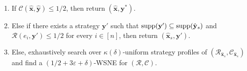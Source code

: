 \begin{algorithm}[H]
\begin{enumerate}[label=\arabic*.,leftmargin=1.8em,itemsep=0.18em,topsep=0.3em]
      \begin{enumerate}[label=(\alph*),leftmargin=2.2em,itemsep=0.1em,topsep=0.1em]
        \item If \(\mathcal{C}(\hat{\mathbf{x}},\hat{\mathbf{y}})\leq 1/2\), then return \((\hat{\mathbf{x}},\mathbf{y}^*)\).
        \item Else if there exists a strategy \(\mathbf{y}'\) such that
        \(\operatorname{supp}(\mathbf{y}')\subseteq\operatorname{supp}(\hat{\mathbf{y}}_s)\) and
        \(\mathcal{R}(e_i,\mathbf{y}')\leq 1/2\) for every \(i\in[n]\), then return \((\hat{\mathbf{x}}_s,\mathbf{y}')\).
        \item Else, exhaustively search over \(\kappa(\delta)\)-uniform strategy profiles of \((\mathcal{R}_{\hat{\mathbf{x}}_s},\mathcal{C}_{\hat{\mathbf{x}}_s})\) and find a \((1/2+3\varepsilon+\delta)\)-WSNE for \((\mathcal{R},\mathcal{C})\).
      \end{enumerate}
  \end{enumerate}
\end{algorithm}
